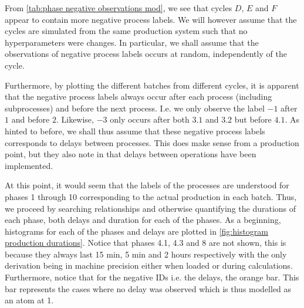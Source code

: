 \documentclass[../Thesis.tex]{subfiles}
\begin{document}
From \autoref{tab:phase negative observations mod}, we see that cycles $D$, $E$ and $F$ appear to contain more negative process labels. We will however assume that the cycles are simulated from the same production system such that no hyperparameters were changes. In particular, we shall assume that the observations of negative process labels occurs at random, independently of the cycle.

Furthermore, by plotting the different batches from different cycles, it is apparent that the negative process labels always occur after each process (including subprocesses) and before the next process. I.e. we only observe the label $-1$ after $1$ and before $2$. Likewise, $-3$ only occurs after both $3.1$ and $3.2$ but before $4.1$. As hinted to before, we shall thus assume that these negative process labels corresponds to delays between processes. This does make sense from a production point, but they also note in \cite{benchmark-model-to-generate-batch-process-data} that delays between operations have been implemented.



\newpage

At this point, it would seem that the labels of the processes are understood for phases 1 through 10 corresponding to the actual production in each batch. Thus, we proceed by searching relationships and otherwise quantifying the durations of each phase, both delays and duration for each of the phases. As a beginning, histograms for each of the phases and delays are plotted in \autoref{fig:histogram production durations}. Notice that phases 4.1, 4.3 and 8 are not shown, this is because they always last 15 min, 5 min and 2 hours respectively with the only derivation being in machine precision either when loaded or during calculations. Furthermore, notice that for the negative IDs i.e. the delays, the orange bar. This bar represents the cases where no delay was observed which is thus modelled as an atom at 1.
\end{document}
